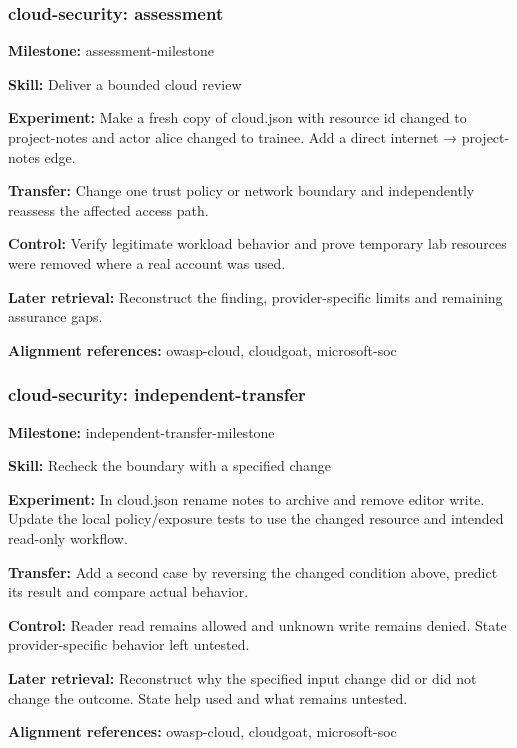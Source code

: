 \subsubsection{cloud-security: assessment}
\noindent\textbf{Milestone:} assessment-milestone\par
\noindent\textbf{Skill:} Deliver a bounded cloud review\par
\noindent\textbf{Experiment:} Make a fresh copy of cloud.json with resource id changed to project-notes and actor alice changed to trainee. Add a direct internet → project-notes edge.\par
\noindent\textbf{Transfer:} Change one trust policy or network boundary and independently reassess the affected access path.\par
\noindent\textbf{Control:} Verify legitimate workload behavior and prove temporary lab resources were removed where a real account was used.\par
\noindent\textbf{Later retrieval:} Reconstruct the finding, provider-specific limits and remaining assurance gaps.\par
\noindent\textbf{Alignment references:} owasp-cloud, cloudgoat, microsoft-soc\par
\subsubsection{cloud-security: independent-transfer}
\noindent\textbf{Milestone:} independent-transfer-milestone\par
\noindent\textbf{Skill:} Recheck the boundary with a specified change\par
\noindent\textbf{Experiment:} In cloud.json rename notes to archive and remove editor write. Update the local policy/exposure tests to use the changed resource and intended read-only workflow.\par
\noindent\textbf{Transfer:} Add a second case by reversing the changed condition above, predict its result and compare actual behavior.\par
\noindent\textbf{Control:} Reader read remains allowed and unknown write remains denied. State provider-specific behavior left untested.\par
\noindent\textbf{Later retrieval:} Reconstruct why the specified input change did or did not change the outcome. State help used and what remains untested.\par
\noindent\textbf{Alignment references:} owasp-cloud, cloudgoat, microsoft-soc\par
